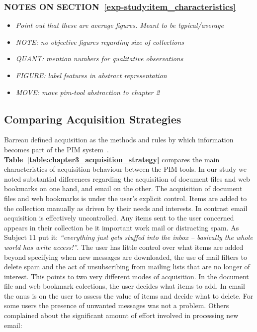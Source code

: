 \subsubsection*{NOTES ON SECTION~\ref{exp-study:item_characteristics}}
\begin{footnotesize}
\begin{itemize}
	\item \textit{Point out that these are average figures. Meant to be typical/average}
	\item \textit{NOTE: no objective figures regarding size of collections}
	\item \textit{QUANT: mention numbers for qualitative observations}
	\item \textit{FIGURE: label features in abstract representation}
	\item \textit{MOVE: move pim-tool abstraction to chapter 2}
\end{itemize}
\end{footnotesize}





\newpage
\subsection{Comparing Acquisition Strategies}
\label{exp-study:qual_acquisition}

Barreau defined acquisition as the methods and rules by which information becomes part of the PIM system~\cite{barreau:95}.
\textbf{Table~\ref{table:chapter3_acquisition_strategy}} compares the main characteristics of acquisition behaviour between the PIM tools.
In our study we noted substantial differences regarding the acquisition of document files and web bookmarks on one hand, and email on the other.
The acquisition of document files and web bookmarks is under the user's explicit control. Items are added to the collection manually as driven by their needs and interests.
In contrast email acquisition is effectively uncontrolled. 
Any items sent to the user concerned appears in their collection be it important work mail or distracting spam.
As Subject 11 put it: \textit{``everything just gets stuffed into the inbox -- basically the whole world has write access!''}. 
The user has little control over what items are added beyond specifying when new messages are downloaded, the use of mail filters to delete spam and the act of unsubscribing from mailing lists that are no longer of interest. 
This points to two very different modes of acquisition.
In the document file and web bookmark colections, the user decides what items to add. 
In email the onus is on the user to assess the value of items and decide what to delete.  For some users the presence of unwanted messages was not a problem. Others complained about the significant amount of effort involved in processing new email:

